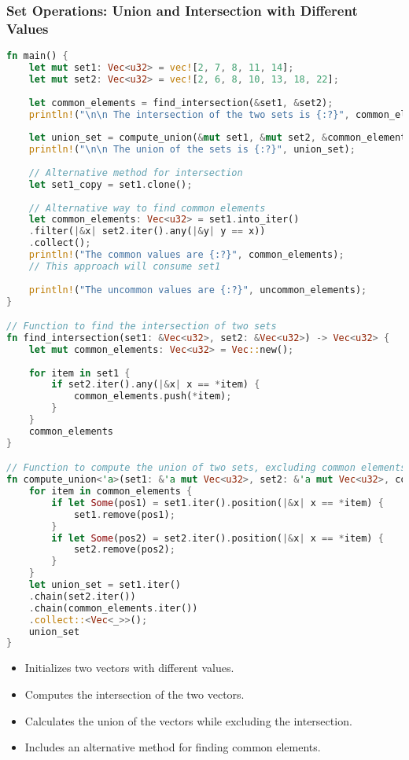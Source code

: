 \documentclass[aspectratio=169, table]{beamer}
\begin{document}
\begin{frame}[fragile]
\frametitle{Set Operations: Union and Intersection with Different Values}
\begin{lstlisting}[language=Rust]
fn main() {
	let mut set1: Vec<u32> = vec![2, 7, 8, 11, 14];
	let mut set2: Vec<u32> = vec![2, 6, 8, 10, 13, 18, 22];
	
	let common_elements = find_intersection(&set1, &set2);
	println!("\n\n The intersection of the two sets is {:?}", common_elements);
	
	let union_set = compute_union(&mut set1, &mut set2, &common_elements);
	println!("\n\n The union of the sets is {:?}", union_set);
	
	// Alternative method for intersection
	let set1_copy = set1.clone();
	
	// Alternative way to find common elements
	let common_elements: Vec<u32> = set1.into_iter()
	.filter(|&x| set2.iter().any(|&y| y == x))
	.collect();
	println!("The common values are {:?}", common_elements);
	// This approach will consume set1
	
	println!("The uncommon values are {:?}", uncommon_elements);
}

// Function to find the intersection of two sets
fn find_intersection(set1: &Vec<u32>, set2: &Vec<u32>) -> Vec<u32> {
	let mut common_elements: Vec<u32> = Vec::new();
	
	for item in set1 {
		if set2.iter().any(|&x| x == *item) {
			common_elements.push(*item);
		}
	}
	common_elements
}

// Function to compute the union of two sets, excluding common elements
fn compute_union<'a>(set1: &'a mut Vec<u32>, set2: &'a mut Vec<u32>, common_elements: &'a Vec<u32>) -> Vec<&'a u32> {
	for item in common_elements {
		if let Some(pos1) = set1.iter().position(|&x| x == *item) {
			set1.remove(pos1);
		}
		if let Some(pos2) = set2.iter().position(|&x| x == *item) {
			set2.remove(pos2);
		}
	}
	let union_set = set1.iter()
	.chain(set2.iter())
	.chain(common_elements.iter())
	.collect::<Vec<_>>();
	union_set
}
\end{lstlisting}
\begin{itemize}
\item Initializes two vectors with different values.
\item Computes the intersection of the two vectors.
\item Calculates the union of the vectors while excluding the intersection.
\item Includes an alternative method for finding common elements.
\end{itemize}
\end{frame}
\end{document}
